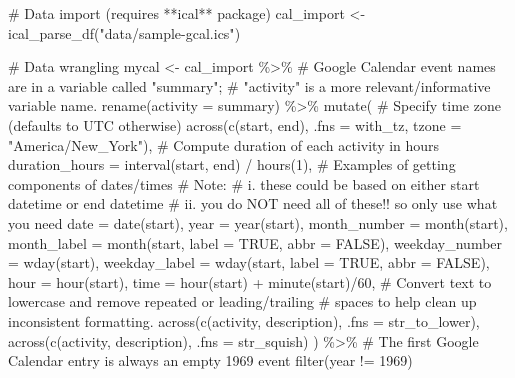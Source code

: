 \documentclass[
  letterpaper,
  DIV=11,
  numbers=noendperiod]{scrartcl}
\newenvironment{Shaded}{\begin{snugshade}}{\end{snugshade}}
\newcommand{\AttributeTok}[1]{\textcolor[rgb]{0.40,0.45,0.13}{#1}}
\newcommand{\CommentTok}[1]{\textcolor[rgb]{0.37,0.37,0.37}{#1}}
\newcommand{\ConstantTok}[1]{\textcolor[rgb]{0.56,0.35,0.01}{#1}}
\newcommand{\DecValTok}[1]{\textcolor[rgb]{0.68,0.00,0.00}{#1}}
\newcommand{\FunctionTok}[1]{\textcolor[rgb]{0.28,0.35,0.67}{#1}}
\newcommand{\NormalTok}[1]{\textcolor[rgb]{0.00,0.23,0.31}{#1}}
\newcommand{\OtherTok}[1]{\textcolor[rgb]{0.00,0.23,0.31}{#1}}
\newcommand{\SpecialCharTok}[1]{\textcolor[rgb]{0.37,0.37,0.37}{#1}}
\newcommand{\StringTok}[1]{\textcolor[rgb]{0.13,0.47,0.30}{#1}}
\begin{document}
\begin{Shaded}
\begin{Highlighting}[]
\CommentTok{\# Data import (requires **ical** package)}
\NormalTok{cal\_import }\OtherTok{\textless{}{-}} \FunctionTok{ical\_parse\_df}\NormalTok{(}\StringTok{"data/sample{-}gcal.ics"}\NormalTok{) }

\CommentTok{\# Data wrangling}
\NormalTok{mycal }\OtherTok{\textless{}{-}} 
\NormalTok{  cal\_import }\SpecialCharTok{\%\textgreater{}\%} 
  \CommentTok{\# Google Calendar event names are in a variable called "summary";}
  \CommentTok{\# "activity" is a more relevant/informative variable name.}
  \FunctionTok{rename}\NormalTok{(}\AttributeTok{activity =}\NormalTok{ summary) }\SpecialCharTok{\%\textgreater{}\%} 
  \FunctionTok{mutate}\NormalTok{(}
    \CommentTok{\# Specify time zone (defaults to UTC otherwise)}
    \FunctionTok{across}\NormalTok{(}\FunctionTok{c}\NormalTok{(start, end), }
           \AttributeTok{.fns =}\NormalTok{ with\_tz, }
           \AttributeTok{tzone =} \StringTok{"America/New\_York"}\NormalTok{),}
    \CommentTok{\# Compute duration of each activity in hours}
    \AttributeTok{duration\_hours =} \FunctionTok{interval}\NormalTok{(start, end) }\SpecialCharTok{/} \FunctionTok{hours}\NormalTok{(}\DecValTok{1}\NormalTok{),}
    \CommentTok{\# Examples of getting components of dates/times }
    \CommentTok{\# Note: }
    \CommentTok{\# i. these could be based on either start datetime or end datetime}
    \CommentTok{\# ii. you do NOT need all of these!! so only use what you need}
    \AttributeTok{date =} \FunctionTok{date}\NormalTok{(start),}
    \AttributeTok{year =} \FunctionTok{year}\NormalTok{(start),}
    \AttributeTok{month\_number =} \FunctionTok{month}\NormalTok{(start),}
    \AttributeTok{month\_label =} \FunctionTok{month}\NormalTok{(start, }
                        \AttributeTok{label =} \ConstantTok{TRUE}\NormalTok{, }
                        \AttributeTok{abbr =} \ConstantTok{FALSE}\NormalTok{),}
    \AttributeTok{weekday\_number =} \FunctionTok{wday}\NormalTok{(start),}
    \AttributeTok{weekday\_label =} \FunctionTok{wday}\NormalTok{(start, }
                         \AttributeTok{label =} \ConstantTok{TRUE}\NormalTok{, }
                         \AttributeTok{abbr =} \ConstantTok{FALSE}\NormalTok{),}
    \AttributeTok{hour =} \FunctionTok{hour}\NormalTok{(start),}
    \AttributeTok{time =} \FunctionTok{hour}\NormalTok{(start) }\SpecialCharTok{+} \FunctionTok{minute}\NormalTok{(start)}\SpecialCharTok{/}\DecValTok{60}\NormalTok{,}
    \CommentTok{\# Convert text to lowercase and remove repeated or leading/trailing }
    \CommentTok{\# spaces to help clean up inconsistent formatting.}
    \FunctionTok{across}\NormalTok{(}\FunctionTok{c}\NormalTok{(activity, description), }
           \AttributeTok{.fns =}\NormalTok{ str\_to\_lower),}
    \FunctionTok{across}\NormalTok{(}\FunctionTok{c}\NormalTok{(activity, description), }
           \AttributeTok{.fns =}\NormalTok{ str\_squish)}
\NormalTok{  ) }\SpecialCharTok{\%\textgreater{}\%} 
  \CommentTok{\# The first Google Calendar entry is always an empty 1969 event}
  \FunctionTok{filter}\NormalTok{(year }\SpecialCharTok{!=} \DecValTok{1969}\NormalTok{)}
\end{Highlighting}
\end{Shaded}
\end{document}
